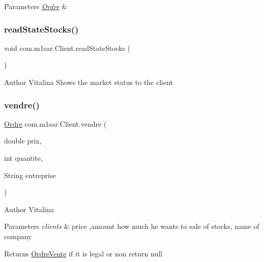\begin{DoxyParams}{Parameters}
{\em \hyperlink{classcom_1_1m1sar_1_1_ordre}{Ordre}} & \\
\hline
\end{DoxyParams}
\mbox{\label{classcom_1_1m1sar_1_1_client_a289d7402a20981f2ab07159e617ec3d8}} 
\subsubsection{\texorpdfstring{read\+State\+Stocks()}{readStateStocks()}}
{\footnotesize\ttfamily void com.\+m1sar.\+Client.\+read\+State\+Stocks (\begin{DoxyParamCaption}{ }\end{DoxyParamCaption})}

\begin{DoxyAuthor}{Author}
Vitalina Shows the market status to the client 
\end{DoxyAuthor}
\mbox{\label{classcom_1_1m1sar_1_1_client_ac7c456af1862320de2c394a23a7d80cd}} 
\subsubsection{\texorpdfstring{vendre()}{vendre()}}
{\footnotesize\ttfamily \hyperlink{classcom_1_1m1sar_1_1_ordre}{Ordre} com.\+m1sar.\+Client.\+vendre (\begin{DoxyParamCaption}\item[{double}]{prix,  }\item[{int}]{quantite,  }\item[{String}]{entreprise }\end{DoxyParamCaption})}

\begin{DoxyAuthor}{Author}
Vitalina 
\end{DoxyAuthor}

\begin{DoxyParams}{Parameters}
{\em clients} & price ,amount how much he wants to sale of stocks, name of company \\
\hline
\end{DoxyParams}
\begin{DoxyReturn}{Returns}
\hyperlink{classcom_1_1m1sar_1_1_ordre_vente}{Ordre\+Vente} if it is legal or non return null 
\end{DoxyReturn}
\mbox{\label{classcom_1_1m1sar_1_1_client_a193f812c6df9bd999c444eb3ec5007da}} 
